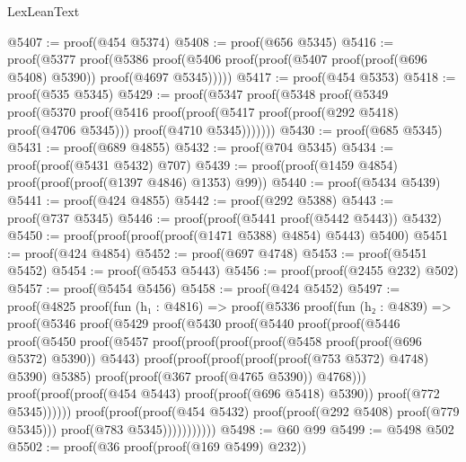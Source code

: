 \begin{lexlean}{LexLeanText}
\begin{coremodule}
@5407 := proof(@454 @5374)
@5408 := proof(@656 @5345)
@5416 := proof(@5377
      proof(@5386
          proof(@5406 proof(proof(@5407 proof(proof(@696 @5408) @5390)) proof(@4697 @5345)))))
@5417 := proof(@454 @5353)
@5418 := proof(@535 @5345)
@5429 := proof(@5347
      proof(@5348
          proof(@5349
              proof(@5370
                  proof(@5416
                      proof(proof(@5417 proof(proof(@292 @5418) proof(@4706 @5345)))
                          proof(@4710 @5345)))))))
@5430 := proof(@685 @5345)
@5431 := proof(@689 @4855)
@5432 := proof(@704 @5345)
@5434 := proof(proof(@5431 @5432) @707)
@5439 := proof(proof(@1459 @4854) proof(proof(proof(@1397 @4846) @1353) @99))
@5440 := proof(@5434 @5439)
@5441 := proof(@424 @4855)
@5442 := proof(@292 @5388)
@5443 := proof(@737 @5345)
@5446 := proof(proof(@5441 proof(@5442 @5443)) @5432)
@5450 := proof(proof(proof(proof(@1471 @5388) @4854) @5443) @5400)
@5451 := proof(@424 @4854)
@5452 := proof(@697 @4748)
@5453 := proof(@5451 @5452)
@5454 := proof(@5453 @5443)
@5456 := proof(proof(@2455 @232) @502)
@5457 := proof(@5454 @5456)
@5458 := proof(@424 @5452)
@5497 := proof(@4825
      proof(fun (h₁ : @4816) =>
        proof(@5336
            proof(fun (h₂ : @4839) =>
              proof(@5346
                  proof(@5429
                      proof(@5430
                          proof(@5440
                              proof(proof(@5446
                                    proof(@5450
                                        proof(@5457
                                            proof(proof(proof(proof(@5458
                                                      proof(proof(@696 @5372) @5390))
                                                    @5443)
                                                  proof(proof(proof(proof(proof(@753 @5372) @4748)
                                                          @5390)
                                                        @5385)
                                                      proof(proof(@367 proof(@4765 @5390)) @4768)))
                                                proof(proof(proof(@454 @5443)
                                                      proof(proof(@696 @5418) @5390))
                                                    proof(@772 @5345))))))
                                  proof(proof(proof(@454 @5432)
                                        proof(proof(@292 @5408) proof(@779 @5345)))
                                      proof(@783 @5345)))))))))))
@5498 := @60 @99
@5499 := @5498 @502
@5502 := proof(@36 proof(proof(@169 @5499) @232))

\end{coremodule}
\end{lexlean}
